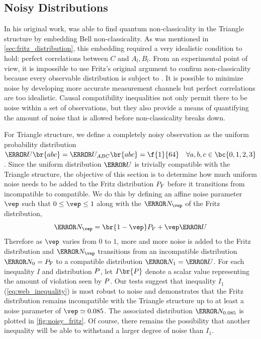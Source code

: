 \documentclass[aps, 10pt, english, twoside, pra, nofootinbib, tightenlines, longbibliography, superscriptaddress]{revtex4-1}
\begin{document}
    \subsection{Noisy Distributions}
    \label{sec:noise}
    In his original work, \citet{Fritz_2012} was able to find quantum non-classicality in the Triangle structure by embedding Bell non-classicality. As was mentioned in \cref{sec:fritz_distribution}, this embedding required a very idealistic condition to hold: perfect correlations between $C$ and $A_l, B_l$. From an experimental point of view, it is impossible to use Fritz's original argument to confirm non-classicality because every observable distribution is subject to . It is possible to minimize noise by developing more accurate measurement channels but perfect correlations are too idealistic. Causal compatibility inequalities not only permit there to be noise within a set of observations, but they also provide a means of quantifying the amount of noise that is allowed before non-classicality breaks down.

    For Triangle structure, we define a completely noisy observation as the uniform probability distribution $\s{U}\br{abc} = \s{U}_{ABC}\br{abc} = \f{1}{64} \quad \forall a,b,c\in \bc{0,1,2,3}$. Since the uniform distribution $\s{U}$ is trivially compatible with the Triangle structure, the objective of this section is to determine how much uniform noise needs to be added to the Fritz distribution $\prob[\fritz]$ before it transitions from incompatible to compatible. We do this by defining an affine noise parameter $\vep$ such that $0 \leq \vep \leq 1$ along with the  $\s{N}_{\vep}$ of the Fritz distribution,
    \[ \s{N}_{\vep} = \br{1 - \vep} \prob[\fritz] + \vep \s{U} \]
    Therefore as $\vep$ varies from $0$ to $1$, more and more noise is added to the Fritz distribution and $\s{N}_{\vep}$ transitions from an incompatible distribution $\s{N}_{0} = \prob[\fritz]$ to a compatible distribution $\s{N}_{1} = \s{U}$. For each inequality $I$ and distribution $\prob$, let $I\br{\prob}$ denote a scalar value representing the amount of violation seen by $\prob$.  Our tests suggest that inequality $I_1$ (\cref{eq:web_inequality}) is most robust to noise and demonstrates that the Fritz distribution remains incompatible with the Triangle structure up to at least a noise parameter of $\vep \simeq 0.085$. The associated distribution $\s N_{0.085}$ is plotted in \cref{fig:noisy_fritz}. Of course, there remains the possibility that another inequality will be able to withstand a larger degree of noise than $I_1$.
\end{document}
